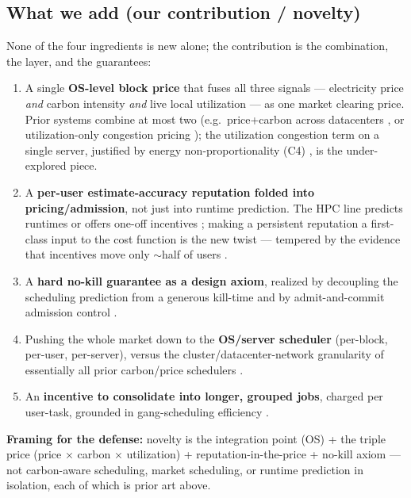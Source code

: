 \documentclass{article}
\begin{document}
\subsection*{What we add (our contribution / novelty)}
None of the four ingredients is new alone; the contribution is the combination, the
layer, and the guarantees:
\begin{enumerate}
\item A single \textbf{OS-level block price} that fuses all three signals ---
electricity price \emph{and} carbon intensity \emph{and} live local utilization ---
as one market clearing price. Prior systems combine at most two (e.g.\ price+carbon
across datacenters \cite{r23}, or utilization-only congestion pricing \cite{r28}); the
utilization congestion term on a single server, justified by energy
non-proportionality (C4) \cite{r9}, is the under-explored piece.
\item A \textbf{per-user estimate-accuracy reputation folded into pricing/admission},
not just into runtime prediction. The HPC line predicts runtimes \cite{r31,r35} or
offers one-off incentives \cite{r34}; making a persistent reputation a first-class
input to the cost function is the new twist --- tempered by the evidence that
incentives move only $\sim$half of users \cite{r32,r33}.
\item A \textbf{hard no-kill guarantee as a design axiom}, realized by decoupling the
scheduling prediction from a generous kill-time \cite{r31} and by admit-and-commit
admission control \cite{r40,r39}.
\item Pushing the whole market down to the \textbf{OS/server scheduler} (per-block,
per-user, per-server), versus the cluster/datacenter-network granularity of
essentially all prior carbon/price schedulers \cite{r11,r23,r12}.
\item An \textbf{incentive to consolidate into longer, grouped jobs}, charged per
user-task, grounded in gang-scheduling efficiency \cite{r45}.
\end{enumerate}
\textbf{Framing for the defense:} novelty is the integration point (OS) + the triple
price (price $\times$ carbon $\times$ utilization) + reputation-in-the-price + no-kill
axiom --- not carbon-aware scheduling, market scheduling, or runtime prediction in
isolation, each of which is prior art above.
\end{document}
